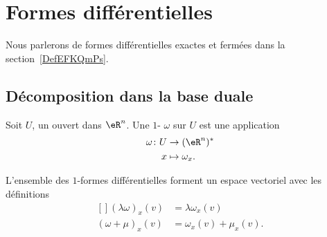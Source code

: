 
\section{Formes différentielles}
\label{SecFormDiffRappel}

Nous parlerons de formes différentielles exactes et fermées dans la section~\ref{DefEFKQmPs}.

\subsection{Décomposition dans la base duale}

\begin{definition}      \label{DEFooMGXSooWioKie}
	Soit \( U\), un ouvert dans \( \eR^n\). Une \( 1\)- \( \omega\) sur \( U\) est une application
	\begin{equation}
		\begin{aligned}
			\omega\colon U & \to (\eR^n)^*     \\
			x              & \mapsto \omega_x.
		\end{aligned}
	\end{equation}
\end{definition}

\begin{remark}
	L'ensemble des \( 1\)-formes différentielles forment un espace vectoriel avec les définitions
	\begin{equation}
		\begin{aligned}[]
			(\lambda\omega)_x(v) & =\lambda\omega_x(v)    \\
			(\omega+\mu)_x(v)    & =\omega_x(v)+\mu_x(v).
		\end{aligned}
	\end{equation}
\end{remark}


